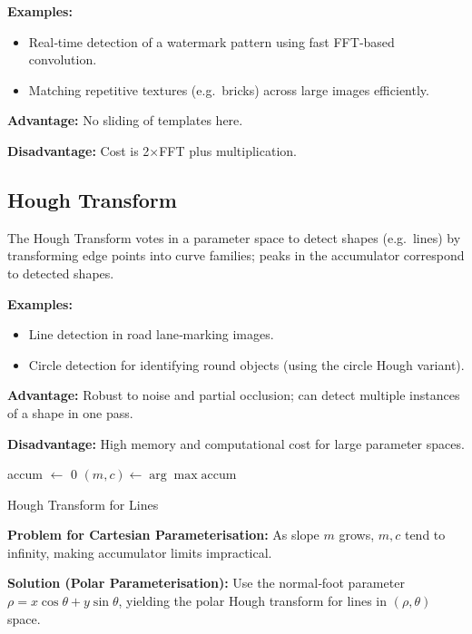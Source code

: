 \textbf{Examples:}
\begin{itemize}
  \item Real‐time detection of a watermark pattern using fast FFT‐based convolution.
  \item Matching repetitive textures (e.g.\ bricks) across large images efficiently.
\end{itemize}

\textbf{Advantage:} No sliding of templates here.

\textbf{Disadvantage:} Cost is 2×FFT plus multiplication.

\subsection*{Hough Transform}
The Hough Transform votes in a parameter space to detect shapes (e.g.\ lines) by transforming edge points into curve families; peaks in the accumulator correspond to detected shapes.

\textbf{Examples:}
\begin{itemize}
  \item Line detection in road lane‐marking images.
  \item Circle detection for identifying round objects (using the circle Hough variant).
\end{itemize}

\textbf{Advantage:} Robust to noise and partial occlusion; can detect multiple instances of a shape in one pass.

\textbf{Disadvantage:} High memory and computational cost for large parameter spaces.

\begin{algorithm}[ht]
\SetAlgoLined
{}
accum \(\gets\) 0\;
\((m,c) \gets \arg\max \text{accum}\)\;
\caption{Hough Transform for Lines}
\end{algorithm}

\textbf{Problem for Cartesian Parameterisation:} As slope \(m\) grows, \(m,c\) tend to infinity, making accumulator limits impractical.

\textbf{Solution (Polar Parameterisation):}  
Use the normal‐foot parameter \(\rho = x\cos\theta + y\sin\theta\), yielding the polar Hough transform for lines in \((\rho,\theta)\) space.

